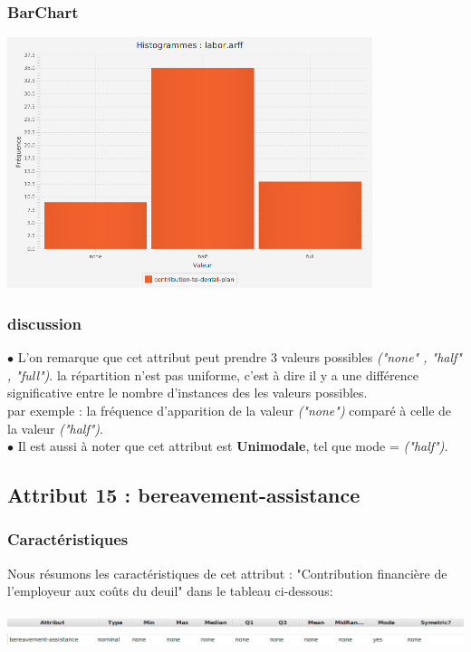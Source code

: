 \documentclass[12pt,a4paper,oneside]{book}
\begin{document}
	\subsubsection{BarChart}
	
	\begin{center}
		\includegraphics[width=0.8\textwidth]{screens/barchart/contribution-to-dental-plan-barchart.png}%
		\label{labelname}%
	\end{center}
	
	\subsubsection{discussion}
	$\bullet $ L'on remarque que cet attribut peut prendre 3 valeurs possibles \textit{("none" , "half" , "full")}. la répartition n'est pas uniforme, c'est à dire il y a une différence significative entre le nombre d'instances des les valeurs possibles.\\
	par exemple : la fréquence d'apparition de la valeur \textit{("none")} comparé à celle de la valeur \textit{("half")}.\\
	$\bullet $ Il est aussi à noter que cet attribut est \textbf{Unimodale}, tel que mode = \textit{("half")}.
	
	\newpage
	
	\subsection{Attribut 15 : bereavement-assistance }
	\subsubsection{Caractéristiques}
	Nous résumons les caractéristiques de cet attribut : "Contribution financière de l'employeur aux coûts du deuil" dans le tableau ci-dessous:
	\begin{center}
		\includegraphics[width=1\textwidth]{screens/att.png}\\ \includegraphics[width=1\textwidth]{screens/att-17.png}%
		\label{labelname}%
	\end{center}
	
\end{document}
